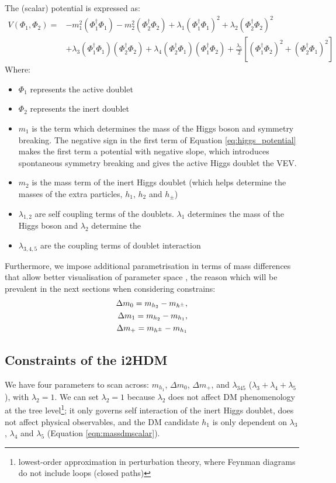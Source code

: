 \documentclass[12pt]{article}
\begin{document}
The (scalar) potential is expressed as:
\begin{equation}
    \begin{split}
        V(\Phi_1, \Phi_2) =& -m_1^2(\Phi_1^\dagger\Phi_1) - m_2^2(\Phi_2^\dagger\Phi_2) + \lambda_1(\Phi_1^\dagger\Phi_1)^2 + \lambda_2(\Phi_2^\dagger\Phi_2)^2 \\
        &+ \lambda_3(\Phi_1^\dagger\Phi_1)(\Phi_2^\dagger\Phi_2) + \lambda_4(\Phi_2^\dagger\Phi_1)(\Phi_1^\dagger\Phi_2) + \frac{\lambda_5}{2}[(\Phi_1^\dagger\Phi_2)^2 + (\Phi_2^\dagger\Phi_1)^2]
        \end{split}
        \label{eq:higgs_potential}
\end{equation}
Where:
\begin{itemize}
    \item $\Phi_1$ represents the active doublet
    \item $\Phi_2$ represents the inert doublet
    \item $m_1$ is the term which determines the mass of the Higgs boson and symmetry breaking. The negative sign in the first term of Equation \ref{eq:higgs_potential} makes the first term a potential with negative slope, which introduces spontaneous symmetry breaking and gives the active Higgs doublet the VEV.
    \item $m_2$ is the mass term of the inert Higgs doublet (which helps determine the masses of the extra particles, $h_1$, $h_2$ and $h_\pm$)
    \item $\lambda_{1, 2}$ are self coupling terms of the doublets. $\lambda_1$ determines the mass of the Higgs boson and $\lambda_2$ determine the 
    \item $\lambda_{3, 4, 5}$ are the coupling terms of doublet interaction
\end{itemize}
Furthermore, we impose additional parametrisation in terms of mass differences that allow better visualisation of parameter space \cite{Belyaev_2022}, the reason which will be prevalent in the next sections when considering constrains:
\begin{align}
\label{eq:mass_diff_1}
    \Delta m_0 = m_{h_2} - m_{h^\pm},\\ \notag
    \Delta m_1 = m_{h_2} - m_{h_1},\\ \notag
    \Delta m_+ = m_{h^\pm} - m_{h_1}
\end{align}

\subsection{Constraints of the i2HDM}
We have four parameters to scan across: $m_{h_1}$, $\Delta m_0$, $\Delta m_+$, and $\lambda_{345}$ ($\lambda_3 + \lambda_4 + \lambda_5$), with $\lambda_2 = 1$. We can set $\lambda_2 = 1$ because $\lambda_2$ does not affect DM phenomenology at the tree level\footnote{lowest-order approximation in perturbation theory, where Feynman diagrams do not include loops (closed paths)}\cite{Belyaev:2016lok}; it only governs self interaction of the inert Higgs doublet, does not affect physical observables, and the DM candidate $h_1$ is only dependent on $\lambda_3$, $\lambda_4$ and $\lambda_5$ (Equation \ref{eqn:massdmscalar}). 
\end{document}
